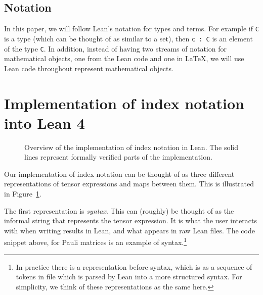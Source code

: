 \documentclass[a4paper, 11pt]{article}
\DeclareRobustCommand{\myinline}{\lstinline}
\begin{document}
\subsection*{Notation}
In this paper, we will follow Lean's notation for types and terms. 
For example if \myinline|C| is a type (which can be thought of as similar to a set),
then \myinline|c : C| is an element of the type \myinline|C|. 
In addition, instead of having two streams of notation for mathematical objects, one from the Lean 
code and one in LaTeX, we will use Lean code throughout represent mathematical objects.
\section{Implementation of index notation into Lean 4}\label{sec:Implementation}

\begin{figure}
  \centering
  \caption{Overview of the implementation of index notation in Lean. The 
  solid lines represent formally verified parts of the implementation.}
  \label{fig:overviewFlow}
\end{figure}

Our implementation of index notation can be thought of as three different representations of tensor 
expressions and maps between them. This is illustrated in Figure~\ref{fig:overviewFlow}.

The first representation is \emph{syntax}. This can (roughly) be thought of as the informal string
that represents the tensor expression. It is what the user interacts with when 
writing results in Lean, and what appears in raw Lean files. The code snippet above, 
for Pauli matrices is an example of syntax.\footnote{In practice there is a representation before syntax, 
 which is as a sequence of tokens in file which is parsed by Lean into a more structured syntax. For simplicity,
 we think of these representations as the same here.} 
\end{document}
